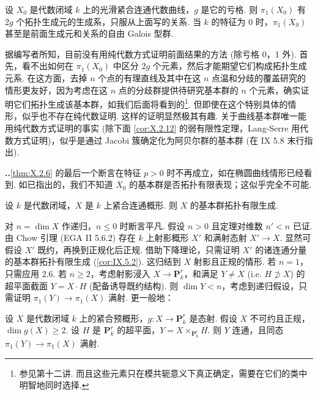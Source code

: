 \begin{theorem}\label{thm:X.2.6}
设 $X_0$ 是代数闭域 $k$ 上的光滑紧合连通代数曲线，$g$ 是它的亏格. 则 $\pi_1(X_0)$ 有 $2g$ 个拓扑生成元的生成系，只服从上面写的关系. 当 $k$ 的特征为 0 时，$\pi_1(X_0)$ 甚至是前面生成元和关系的自由 Galois 型群.
\end{theorem}

\begin{remark}\label{rem:X.2.7}
据编写者所知，目前没有用纯代数方式证明前面结果的方法 (除亏格 0，1 外). 首先，看不出如何在 $\pi_1(X_0)$ 中区分 $2g$ 个元素，然后才能期望它们构成拓扑生成元系. 在这方面，去掉 $n$ 个点的有理直线及其中在这 $n$ 点温和分歧的覆盖研究的情形更友好，因为考虑在这 $n$ 点的分歧群提供待研究基本群的 $n$ 个元素，确实证明它们拓扑生成该基本群，如我们后面将看到的\footnote{参见第十二讲. 而且这些元素只在模共轭意义下真正确定，需要在它们的类中明智地同时选择.}. 但即使在这个特别具体的情形，似乎也不存在纯代数证明. 这样的证明显然极其有趣. 关于曲线基本群唯一能用纯代数方式证明的事实 (除下面 \ref{cor:X.2.12} 的弱有限性定理，Lang-Serre \cite{exp10-2} 用代数方式证明)，似乎是通过 Jacobi 簇确定化为阿贝尔群的基本群 (在 IX 5.8 末行指出).
\end{remark}

\noindent\textbf{\thesection..}\quad \ref{thm:X.2.6} 的最后一个断言在特征 $p > 0$ 时不再成立，如在椭圆曲线情形已经看到. 如已指出的，我们不知道 $X_0$ 的基本群是否拓扑有限表现；这似乎完全不可能.

\begin{theorem}\label{thm:X.2.9}
设 $k$ 是代数闭域，$X$ 是 $k$ 上紧合连通概形. 则 $X$ 的基本群拓扑有限生成.
\end{theorem}

对 $n = \dim X$ 作递归，$n \leqslant 0$ 时断言平凡. 假设 $n > 0$ 且定理对维数 $n' < n$ 已证. 由 Chow 引理 (EGA II 5.6.2) 存在 $k$ 上射影概形 $X'$ 和满射态射 $X' \to X$. 显然可假设 $X'$ 既约，再换到正规化后正规. 借助下降理论，只需证明 $X'$ 的诸连通分量的基本群拓扑有限生成 (\cref{cor:IX.5.2}). 这归结到 $X$ 射影且正规的情形. 若 $n = 1$，只需应用 2.6. 若 $n \geqslant 2$，考虑射影浸入 $X \to \mathbf{P}^r_k$，和满足 $Y \neq X$ (i.e. $H \not\supset X$) 的超平面截面 $Y = X \cdot H$ (配备诱导既约结构). 则 $\dim Y < n$，考虑到递归假设，只需证明 $\pi_1(Y) \to \pi_1(X)$ 满射. 更一般地：

\begin{lemma}\label{lem:X.2.10}
设 $X$ 是代数闭域 $k$ 上的紧合预概形，$g \colon X \to \mathbf{P}^r_k$ 是态射. 假设 $X$ 不可约且正规，$\dim g(X) \geqslant 2$. 设 $H$ 是 $\mathbf{P}^r_k$ 的超平面，$Y = X \times_{\mathbf{P}^r_k} H$. 则 $Y$ 连通，且同态 $\pi_1(Y) \to \pi_1(X)$ 满射.
\end{lemma}

